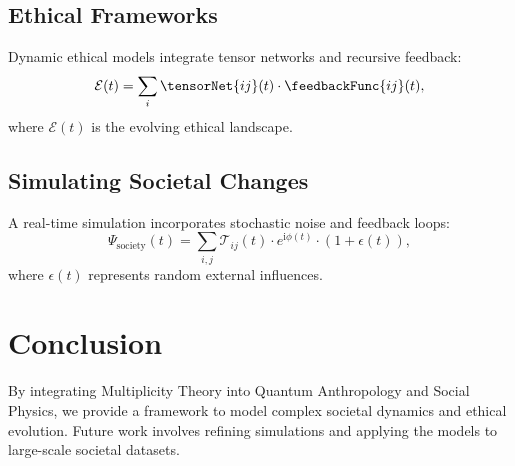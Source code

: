 \documentclass{article}
\theoremstyle{plain}
\begin{document}
\subsection{Ethical Frameworks}
Dynamic ethical models integrate tensor networks and recursive feedback:
\begin{equation}
    \mathcal{E}(t) = \sum_{i} \tensorNet{ij}(t) \cdot \feedbackFunc{ij}(t),
\end{equation}
where \( \mathcal{E}(t) \) is the evolving ethical landscape.

\subsection{Simulating Societal Changes}
A real-time simulation incorporates stochastic noise and feedback loops:
\begin{equation}
    \Psi_{\text{society}}(t) = \sum_{i,j} \mathcal{T}_{ij}(t) \cdot e^{\mathrm{i}\phi(t)} \cdot (1 + \epsilon(t)),
\end{equation}
where \( \epsilon(t) \) represents random external influences.

\section{Conclusion}
By integrating Multiplicity Theory into Quantum Anthropology and Social Physics, we provide a framework to model complex societal dynamics and ethical evolution. Future work involves refining simulations and applying the models to large-scale societal datasets.


\nocite{*}


\end{document}
